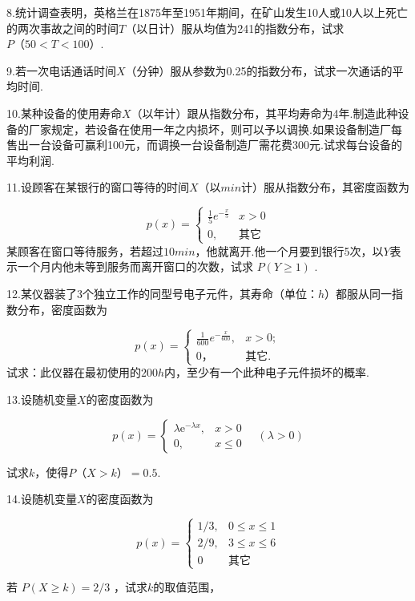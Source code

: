 8.统计调查表明，英格兰在1875年至1951年期间，在矿山发生10人或10人以上死亡的两次事故之间的时间$ T $（以日计）服从均值为241的指数分布，试求$ P（50<T<100） $.

9.若一次电话通话时间$ X $（分钟）服从参数为0.25的指数分布，试求一次通话的平均时间.

10.某种设备的使用寿命$ X $（以年计）跟从指数分布，其平均寿命为4年.制造此种设备的厂家规定，若设备在使用一年之内损坏，则可以予以调换.如果设备制造厂每售出一台设备可赢利100元，而调换一台设备制造厂需花费300元.试求每台设备的平均利润.

11.设顾客在某银行的窗口等待的时间$ X $（以$ min $计）服从指数分布，其密度函数为

\[
p(x)=\left\{
\begin{array}{ll}
{\frac{1}{5} e^{-\frac{x}{5}}} & {x>0} \\ 
{0,}  &  {\text{其它}}
\end{array}\right.
\]
某顾客在窗口等待服务，若超过$ 10min $，他就离开.他一个月要到银行5次，以$ Y $表示一个月内他未等到服务而离开窗口的次数，试求 $P(Y \geqslant 1)$ .

12.某仪器装了3个独立工作的同型号电子元件，其寿命（单位：$ h $）都服从同一指数分布，密度函数为

\[
p(x)=\left\{\begin{array}{ll}
{\frac{1}{600} e^{-\frac{x}{600}},} & {x>0 ;} \\ 
{0，} & {\text{其它.}}
\end{array}\right.
\]
试求：此仪器在最初使用的$ 200h $内，至少有一个此种电子元件损坏的概率.

13.设随机变量$ X $的密度函数为

\[
p(x)=\left\{ \begin{array}{ll}
{\lambda \mathrm{e}^{-\lambda x},} & {x>0} \\ 
{0,} & {x \leqslant 0}
\end{array}\right. \quad(\lambda>0)
\]

试求$ k $，使得$ P（X>k）=0.5 $.

14.设随机变量$ X $的密度函数为

\[
p(x)=\left\{\begin{array}{ll}
{1 / 3,} & {0 \leqslant x \leqslant 1} \\ 
{2 / 9,} & {3 \leqslant x \leqslant 6} \\ 
{0} & {\text{其它}}
\end{array}
\right.
\]

若 $P(X \geqslant k)=2 / 3$ ，试求$ k $的取值范围，

